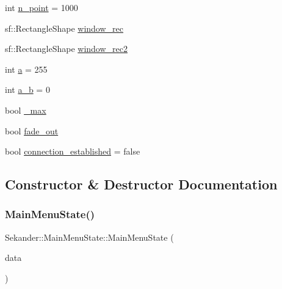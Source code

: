 \begin{DoxyCompactItemize}
int \hyperlink{classSekander_1_1MainMenuState_a31a95c62e0539845388ac18d68c51098}{n\+\_\+point} = 1000
\item 
sf\+::\+Rectangle\+Shape \hyperlink{classSekander_1_1MainMenuState_ab4bc4a5922ecc10449370f3e7fa94d47}{window\+\_\+rec}
\item 
sf\+::\+Rectangle\+Shape \hyperlink{classSekander_1_1MainMenuState_a9e090e4993c718debc56945b2921b751}{window\+\_\+rec2}
\item 
int \hyperlink{classSekander_1_1MainMenuState_aa371caf0a47f5f6423236d0d33cccf22}{a} = 255
\item 
int \hyperlink{classSekander_1_1MainMenuState_a6325eb8b3d56ee143f033ea897ff9bbd}{a\+\_\+b} = 0
\item 
bool \hyperlink{classSekander_1_1MainMenuState_acea6e58d065065f4bc83b27f8b082a13}{\+\_\+max}
\item 
bool \hyperlink{classSekander_1_1MainMenuState_a186148721efc437af0da39d75ebe00c3}{fade\+\_\+out}
\item 
bool \hyperlink{classSekander_1_1MainMenuState_ad0b61501d7825abab5207f3eb83c7196}{connection\+\_\+established} = false
\end{DoxyCompactItemize}


\subsection{Constructor \& Destructor Documentation}
\mbox{\label{classSekander_1_1MainMenuState_a6358c7103ad56cb05813567ab1d591ba}} 
\subsubsection{\texorpdfstring{Main\+Menu\+State()}{MainMenuState()}\hspace{0.1cm}{\footnotesize\ttfamily [1/2]}}
{\footnotesize\ttfamily Sekander\+::\+Main\+Menu\+State\+::\+Main\+Menu\+State (\begin{DoxyParamCaption}\item[{\hyperlink{namespaceSekander_a1d69b002ba2d23020901c28f0def5e16}{Game\+Data\+Ref}}]{data }\end{DoxyParamCaption})}

\mbox{\label{classSekander_1_1MainMenuState_aeeea19d38e84e2ed002a4b47d6d8885e}} 
